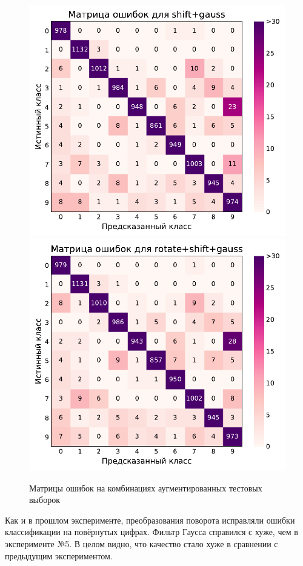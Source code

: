 \documentclass[12pt]{article}
\begin{document}
\begin{figure}[!h]
    \includegraphics[scale=0.6]{6_aug_conf_mat_shift+gauss.pdf}
    \includegraphics[scale=0.6]{6_aug_conf_mat_rotate+shift+gauss.pdf}
    \caption{Матрицы ошибок на комбинациях аугментированных тестовых выборок}
    \label{fig:6_aug_conf_mat_2}
\end{figure}

Как и в прошлом эксперименте, преобразования поворота исправляли ошибки классификации на повёрнутых цифрах. Фильтр Гаусса справился с хуже, чем в эксперименте №5. В целом видно, что качество стало хуже в сравнении с предыдущим экспериментом.
\end{document}

